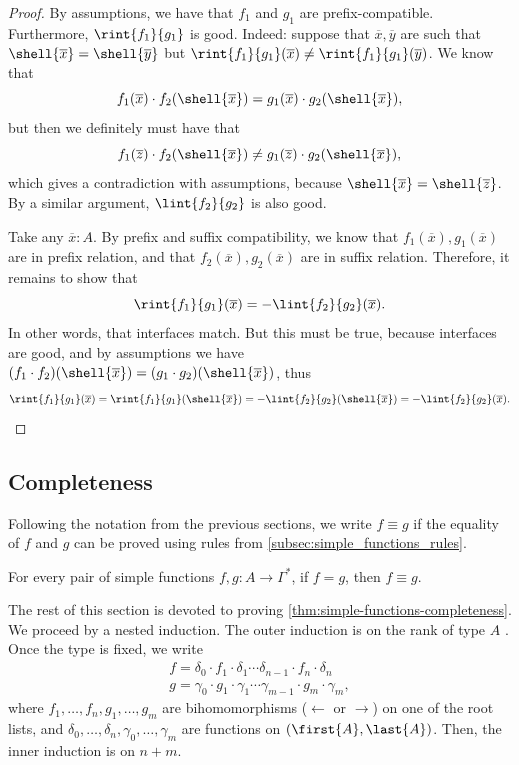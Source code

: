 \begin{proof}
    By assumptions, we have that $f_1$ and $g_1$ are prefix-compatible. Furthermore, $\rint{f_1}{g_1}$ is good. Indeed: suppose that $\overline x, \overline y$ are such that $\shell{\overline x} = \shell{\overline y}$ but $\rint{f_1}{g_1}(\overline x) \neq \rint{f_1}{g_1}(\overline y)$. We know that 
    \[
        f_1(\overline x) \cdot f_2(\shell{\overline x}) = g_1(\overline x) \cdot g_2(\shell{\overline x}),
    \]
    but then we definitely must have that
    \[
        f_1(\overline z) \cdot f_2(\shell{\overline x}) \neq g_1(\overline z) \cdot g_2(\shell{\overline x}),
    \]
    which gives a contradiction with assumptions, because $\shell{\overline x} = \shell{\overline z}$. By a similar argument, $\lint{f_2}{g_2}$ is also good. 

    Take any $\overline x : A$. By prefix and suffix compatibility, we know that $f_1(\overline x), g_1(\overline x)$ are in prefix relation, and that $f_2(\overline x), g_2(\overline x)$ are in suffix relation. Therefore, it remains to show that 
    \[
        \rint{f_1}{g_1}(\overline x) = - \lint{f_2}{g_2}(\overline x).
    \]
    In other words, that interfaces match. But this must be true, because interfaces are good, and by assumptions we have $(f_1 \cdot f_2)(\shell{\overline x}) = (g_1 \cdot g_2)(\shell{ \overline x})$, thus
    \[
        \rint{f_1}{g_1}(\overline x) = \rint{f_1}{g_1}(\shell{\overline x}) = - \lint{f_2}{g_2}(\shell{\overline x}) = - \lint{f_2}{g_2}(\overline x). \qedhere
    \]
\end{proof}

\subsection{Completeness}

Following the notation from the previous sections, we write $f \equiv g$ if the equality of $f$ and $g$ can be proved using rules from \cref{subsec:simple_functions_rules}.

\begin{theorem}\label{thm:simple-functions-completeness}
    For every pair of simple functions $f,g : A \to \Gamma^*$, if $f = g$, then $f \equiv g$. 
\end{theorem}

The rest of this section is devoted to proving \cref{thm:simple-functions-completeness}. We proceed by a nested induction. The outer induction is on the rank of type $A$ . Once the type is fixed, we write
\begin{gather*}
    f = \delta_0 \cdot f_1 \cdot \delta_1 \cdots \delta_{n-1} \cdot f_n \cdot \delta_n \\ 
    g = \gamma_0 \cdot g_1 \cdot \gamma_1 \cdots \gamma_{m-1} \cdot g_m \cdot \gamma_m,
\end{gather*}
where $f_1, \dots, f_n, g_1, \dots, g_m$ are bihomomorphisms ($\leftarrow$ or $\rightarrow$) on one of the root lists, and $\delta_0, \dots, \delta_n, \gamma_0, \dots, \gamma_m$ are functions on $(\first{A}, \last{A})$. Then, the inner induction is on $n+m$. 

